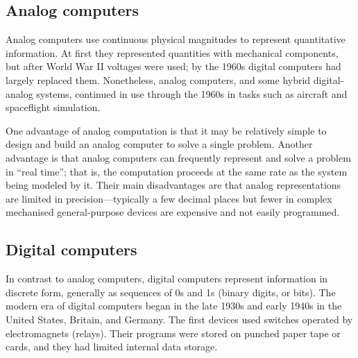 \documentclass[11pt,a4paper,twoside]{article}
\begin{document}
\subsection{Analog computers}
Analog computers use continuous physical magnitudes to represent quantitative information. At first they represented quantities with mechanical components, but after World War II voltages were used; by the 1960s digital computers had largely replaced them. Nonetheless, analog computers, and some hybrid digital-analog systems, continued in use through the 1960s in tasks such as aircraft and spaceflight simulation.\par
One advantage of analog computation is that it may be relatively simple to design and build an analog computer to solve a single problem. Another advantage is that analog computers can frequently represent and solve a problem in “real time”; that is, the computation proceeds at the same rate as the system being modeled by it. Their main disadvantages are that analog representations are limited in precision—typically a few decimal places but fewer in complex mechanised general-purpose devices are expensive and not easily programmed.

\subsection{Digital computers}
In contrast to analog computers, digital computers represent information in discrete form, generally as sequences of 0s and 1s (binary digits, or bits). The modern era of digital computers began in the late 1930s and early 1940s in the United States, Britain, and Germany. The first devices used switches operated by electromagnets (relays). Their programs were stored on punched paper tape or cards, and they had limited internal data storage.
\end{document}
